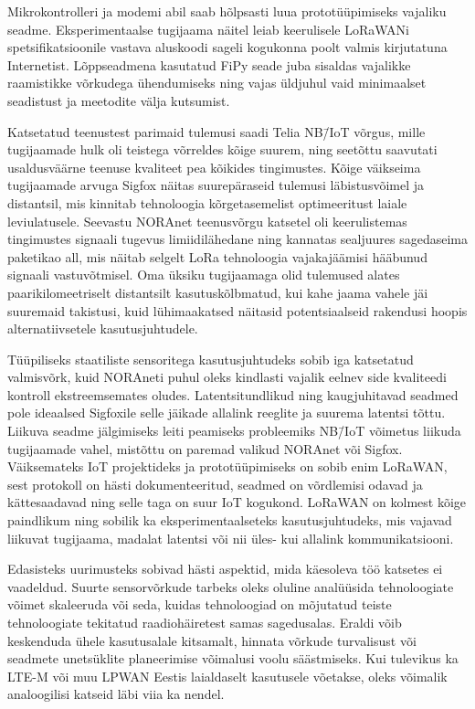\documentclass[12pt]{article}
\begin{document}
    Mikrokontrolleri ja modemi abil saab hõlpsasti luua prototüüpimiseks vajaliku seadme.
    Eksperimentaalse tugijaama näitel leiab keerulisele LoRaWANi spetsifikatsioonile vastava aluskoodi sageli kogukonna poolt valmis kirjutatuna Internetist.
    Lõppseadmena kasutatud FiPy seade juba sisaldas vajalikke raamistikke võrkudega ühendumiseks ning vajas üldjuhul vaid minimaalset seadistust ja meetodite välja kutsumist.

    Katsetatud teenustest parimaid tulemusi saadi Telia NB\=/IoT võrgus, mille tugijaamade hulk oli teistega võrreldes kõige suurem, ning seetõttu saavutati usaldusväärne teenuse kvaliteet pea kõikides tingimustes.
    Kõige väikseima tugijaamade arvuga Sigfox näitas suurepäraseid tulemusi läbistusvõimel ja distantsil, mis kinnitab tehnoloogia kõrgetasemelist optimeeritust laiale leviulatusele.
    Seevastu NORAnet teenusvõrgu katsetel oli keerulistemas tingimustes signaali tugevus limiidilähedane ning kannatas sealjuures sagedaseima paketikao all, mis näitab selgelt LoRa tehnoloogia vajakajäämisi hääbunud signaali vastuvõtmisel.
    Oma üksiku tugijaamaga olid tulemused alates paarikilomeetriselt distantsilt kasutuskõlbmatud, kui kahe jaama vahele jäi suuremaid takistusi, kuid lühimaakatsed näitasid potentsiaalseid rakendusi hoopis alternatiivsetele kasutusjuhtudele.

    Tüüpiliseks staatiliste sensoritega kasutusjuhtudeks sobib iga katsetatud valmisvõrk, kuid NORAneti puhul oleks kindlasti vajalik eelnev side kvaliteedi kontroll ekstreemsemates oludes.
    Latentsitundlikud ning kaugjuhitavad seadmed pole ideaalsed Sigfoxile selle jäikade allalink reeglite ja suurema latentsi tõttu.
    Liikuva seadme jälgimiseks leiti peamiseks probleemiks NB\=/IoT võimetus liikuda tugijaamade vahel, mistõttu on paremad valikud NORAnet või Sigfox.
    Väiksemateks IoT projektideks ja prototüüpimiseks on sobib enim LoRaWAN, sest protokoll on hästi dokumenteeritud, seadmed on võrdlemisi odavad ja kättesaadavad ning selle taga on suur IoT kogukond.
    LoRaWAN on kolmest kõige paindlikum ning sobilik ka eksperimentaalseteks kasutusjuhtudeks, mis vajavad liikuvat tugijaama, madalat latentsi või nii üles- kui allalink kommunikatsiooni.

    Edasisteks uurimusteks sobivad hästi aspektid, mida käesoleva töö katsetes ei vaadeldud.
    Suurte sensorvõrkude tarbeks oleks oluline analüüsida tehnoloogiate võimet skaleeruda või seda, kuidas tehnoloogiad on mõjutatud teiste tehnoloogiate tekitatud raadiohäiretest samas sagedusalas.
    Eraldi võib keskenduda ühele kasutusalale kitsamalt, hinnata võrkude turvalisust või seadmete unetsüklite planeerimise võimalusi voolu säästmiseks.
    Kui tulevikus ka LTE-M või muu LPWAN Eestis laialdaselt kasutusele võetakse, oleks võimalik analoogilisi katseid läbi viia ka nendel.
\end{document}
